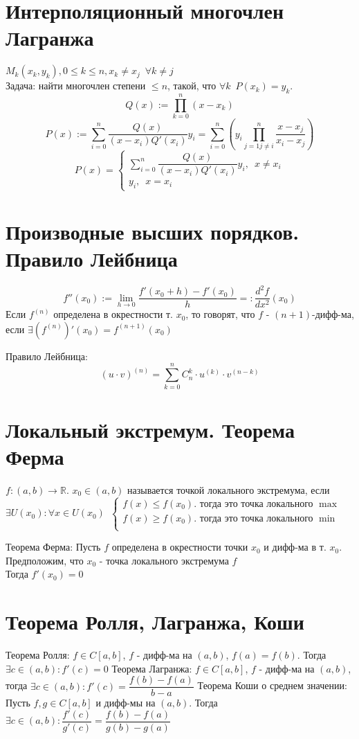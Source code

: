 \documentclass[11pt, a4paper, utf-8]{article}
\def\R{\mathbb{R}}
\def\sp{\, \, \,}
\begin{document}
    \section{Интерполяционный многочлен Лагранжа}
    $M_k(x_k, y_k), 0 \leq k \leq n, x_k \neq x_j \sp \forall k \neq j$\\
    Задача: найти многочлен степени $\leq n$, такой, что $\forall k \sp P(x_k) = y_k$.
    $$Q(x) := \prod_{k = 0}^n (x-x_k)$$
    $$P(x) := \sum_{i = 0}^{n} \frac{Q(x)}{(x-x_i)Q'(x_i)}y_i = \sum_{i = 0}^n \left(y_i \prod_{j = 1 j \neq i}^n \frac{x-x_j}{x_i-x_j}\right)$$
    $$P(x) = \begin{cases}
        \sum \limits_{i = 0}^{n} \dfrac{Q(x)}{(x-x_i)Q'(x_i)}y_i, \sp x \neq x_i \\
        y_i, \sp x = x_i
    \end{cases}$$

    \section{Производные высших порядков. Правило Лейбница}
    $$f''(x_0) := \lim_{h \to 0} \frac{f'(x_0 + h)-f'(x_0)}{h} =: \frac{d^2f}{dx^2}(x_0)$$
    Если $f^{(n)}$ определена в окрестности т. $x_0$, то говорят, что $f$ - $(n+1)$-дифф-ма, если $\exists (f^{(n)})'(x_0) = f^{(n+1)}(x_0)$

    Правило Лейбница:
    $$(u \cdot v)^{(n)} = \sum_{k = 0}^n C_n^k \cdot u^{(k)} \cdot v^{(n-k)}$$

    \section{Локальный экстремум. Теорема Ферма}
    $f: (a,b) \to \R$. $x_0 \in (a,b)$ называется точкой локального экстремума, если $\exists U(x_0) : \forall x \in U(x_0) \sp \begin{cases}
        f(x) \leq f(x_0) \text{. тогда это точка локального } \max \\
        f(x) \geq f(x_0) \text{. тогда это точка локального } \min \\
    \end{cases}$

    Теорема Ферма: Пусть $f$ определена в окрестности точки $x_0$ и дифф-ма в т. $x_0$. Предположим, что $x_0$ - точка локального экстремума $f$\\
    Тогда $f'(x_0) = 0$
    
    \section{Теорема Ролля, Лагранжа, Коши}
    Теорема Ролля: $f \in C[a,b]$, $f$ - дифф-ма на $(a,b)$, $f(a) = f(b)$. Тогда $\exists c \in (a,b): f'(c) = 0$
    Теорема Лагранжа: $f \in C[a,b]$, $f$ - дифф-ма на $(a,b)$, тогда $\exists c \in (a,b): f'(c) = \dfrac{f(b) - f(a)}{b-a}$
    Теорема Коши о среднем значении: Пусть $f, g \in C[a,b]$ и дифф-мы на $(a,b)$. Тогда $\exists c \in (a,b): \dfrac{f'(c)}{g'(c)} = \dfrac{f(b) - f(a)}{g(b) - g(a)}$
    
\end{document}
